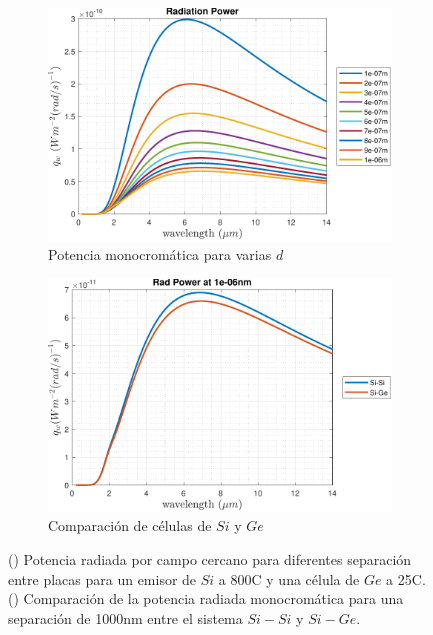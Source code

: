 \begin{figure}[H]
\centering
\begin{subfigure}[b]{0.49\textwidth}
	\centering
		\includegraphics[width=1.00\textwidth]{figuras/Resultados/radiacion/SiGe.pdf}
	\caption{Potencia monocromática para varias $d$}
	\label{fig:rad_SiGe}
\end{subfigure}
\hfill
\begin{subfigure}[b]{0.49\textwidth}
	\centering
		\includegraphics[width=1.00\textwidth]{figuras/Resultados/radiacion/SiSi_vs_SiGe.pdf}
	\caption{Comparación de células de $Si$ y $Ge$}
	\label{fig:SiSi_vs_SiGe}
\end{subfigure}
\caption{() Potencia radiada por campo cercano para diferentes separación entre placas para un emisor de $Si$ a 800\textdegree C y una célula de $Ge$ a 25\textdegree C. () Comparación de la potencia radiada monocromática para una separación de 1000nm entre el sistema $Si-Si$ y $Si-Ge$.}
\label{fig:rads_SiGe}
\end{figure}
